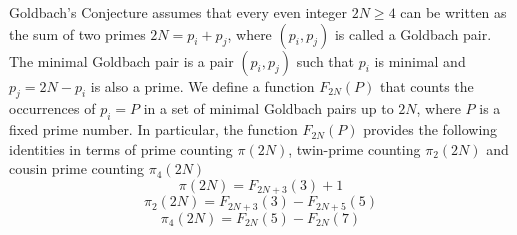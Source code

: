 Goldbach's Conjecture assumes that every even integer $2N \geq 4$ can be written as the sum of two primes
$2N = p_i + p_j$, where $(p_i, p_j)$ is called a Goldbach pair.
The minimal Goldbach pair is a pair $(p_i, p_j)$ such that $p_i$ is minimal and $p_j = 2N - p_i$ is also a prime.
We define a function $F_{2N}(P)$ that counts the occurrences of $p_i = P$ in a set of minimal Goldbach pairs
up to $2N$, where $P$ is a fixed prime number.
In particular, the function $F_{2N}(P)$ provides the following identities in terms of prime counting $\pi(2N)$,
twin-prime counting $\pi_2(2N)$ and cousin prime counting $\pi_4(2N)$
\[
    \pi(2N) = F_{2N+3}(3) + 1
\]
\[
    \pi_2(2N) = F_{2N+3}(3) - F_{2N+5}(5)
\]
\[
    \pi_4(2N) = F_{2N}(5) - F_{2N}(7)
\]
